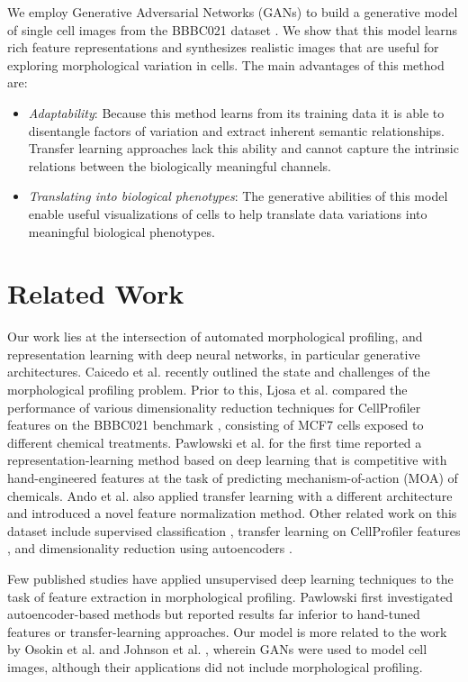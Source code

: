\documentclass{article}
\begin{document}
We employ Generative Adversarial Networks (GANs) \cite{goodfellow2014generative} to build a generative model of single cell images from the BBBC021 dataset \cite{Ljosa2012}. We show that this model learns rich feature representations and synthesizes realistic images that are useful for exploring morphological variation in cells. The main advantages of this method are:
\begin{itemize}
  \item \emph{Adaptability}: Because this method learns from its training data it is able to disentangle factors of variation and extract inherent semantic relationships. Transfer learning approaches lack this ability and cannot capture the intrinsic relations between the biologically meaningful channels.
  \item \emph{Translating into biological phenotypes}: The generative abilities of this model enable useful visualizations of cells to help translate data variations into meaningful biological phenotypes.
\end{itemize}

\section{Related Work}

Our work lies at the intersection of automated morphological profiling, and representation learning with deep neural networks, in particular generative architectures. Caicedo et al. \cite{caicedo2017data} recently outlined the state and challenges of the morphological profiling problem. Prior to this, Ljosa et al. \cite{Ljosa2013} compared the performance of various dimensionality reduction techniques for CellProfiler features on the BBBC021 benchmark \cite{Ljosa2012}, consisting of MCF7 cells exposed to different chemical treatments. Pawlowski et al. \cite{pawlowski2016automating} for the first time reported a representation-learning method based on deep learning that is competitive with hand-engineered features at the task of predicting mechanism-of-action (MOA) of chemicals. Ando et al. \cite{ando2017improving} also applied transfer learning with a different architecture and introduced a novel feature normalization method. Other related work on this dataset include supervised classification \cite{Kraus2016a}, transfer learning on CellProfiler features \cite{Kandaswamy2016}, and dimensionality reduction using autoencoders \cite{Zamparo2015}.

Few published studies have applied unsupervised deep learning techniques to the task of feature extraction in morphological profiling. Pawlowski \cite{pawlowski2016msc} first investigated autoencoder-based methods but reported results far inferior to hand-tuned features or transfer-learning approaches. Our model is more related to the work by Osokin et al. \cite{osokin2017gans} and Johnson et al. \cite{johnson2017generative}, wherein GANs were used to model cell images, although their applications did not include morphological profiling.
\end{document}
